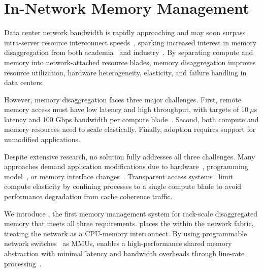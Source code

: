 \section{In-Network Memory Management}
\label{sec:mindintro}
Data center network bandwidth is rapidly approaching and may soon surpass intra-server resource interconnect speeds~\cite{terabitethernet, remotememory}, sparking increased interest in memory disaggregation from both academia~\cite{memdisagg2, memdisagg3, memdisagg4, memdisagg5, memdisagg6, memdisagg1, legoos, infiniswap, fastswap, disagg, disaggfault} and industry~\cite{industry0, industry1, industry2, industry3, industry4, industry5}. By separating compute and memory into network-attached resource blades, memory disaggregation improves resource utilization, hardware heterogeneity, elasticity, and failure handling in data centers.

However, memory disaggregation faces three major challenges. First, remote memory access must have low latency and high throughput, with targets of $10~\mu$s latency and 100 Gbps bandwidth per compute blade~\cite{legoos, infiniswap, fastswap, disagg}. Second, both compute and memory resources need to scale elastically. Finally, adoption requires support for unmodified applications.

Despite extensive research, no solution fully addresses all three challenges. Many approaches demand application modifications due to hardware~\cite{industry1, industry2, nwsupport, memdisagg4}, programming model~\cite{piccolo, grappa}, or memory interface changes~\cite{farm, ramcloud, herd}. Transparent access systems~\cite{legoos, infiniswap, fastswap} limit compute elasticity by confining processes to a single compute blade to avoid performance degradation from cache coherence traffic.

We introduce \mind, the first memory management system for rack-scale disaggregated memory that meets all three requirements. \mind places the \mmm within the network fabric, treating the network as a CPU-memory interconnect. By using programmable network switches~\cite{progswitch1, progswitch2, progswitch3} as MMUs, \mind enables a high-performance shared memory abstraction with minimal latency and bandwidth overheads through line-rate processing~\cite{progswitch1}.

